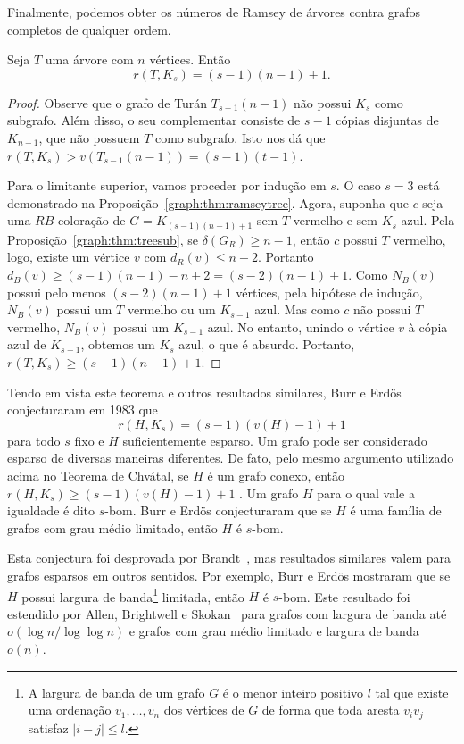 Finalmente, podemos obter os números de Ramsey de árvores contra grafos completos de qualquer ordem.

\begin{theorem}
\label{graph:thm:chvatal}
Seja $T$ uma árvore com $n$ vértices. Então
\[r(T,K_s) = (s-1)(n-1) + 1.\]
\end{theorem}
\begin{proof}
Observe que o grafo de Turán $T_{s-1}(n-1)$ não possui $K_s$ como subgrafo. Além disso, o seu complementar consiste de $s-1$ cópias disjuntas de $K_{n-1}$, que não possuem $T$ como subgrafo. Isto nos dá que $r(T,K_s) > v(T_{s-1}(n-1)) = (s-1)(t-1)$.

Para o limitante superior, vamos proceder por indução em $s$. O caso $s = 3$ está demonstrado na Proposição~\ref{graph:thm:ramseytree}. Agora, suponha que $c$ seja uma $RB$-coloração de $G = K_{(s-1)(n-1) + 1}$ sem $T$ vermelho e sem $K_s$ azul.
Pela Proposição~\ref{graph:thm:treesub}, se $\delta(G_R) \geq n-1$, então $c$ possui $T$ vermelho, logo, existe um vértice $v$ com $d_R(v) \leq n - 2$. Portanto $d_B(v) \geq (s-1)(n-1) - n + 2 = (s-2)(n-1) + 1$.
Como $N_B(v)$ possui pelo menos $(s-2)(n-1) + 1$ vértices, pela hipótese de indução, $N_B(v)$ possui um $T$ vermelho ou um $K_{s-1}$ azul. Mas como $c$ não possui $T$ vermelho, $N_B(v)$ possui um $K_{s-1}$ azul. No entanto, unindo o vértice $v$ à cópia azul de $K_{s-1}$, obtemos um $K_s$ azul, o que é absurdo. Portanto, $r(T,K_s) \geq (s-1)(n-1) + 1$.
\end{proof}

Tendo em vista este teorema e outros resultados similares, Burr e Erdös~\cite{burr1983generalizations} conjecturaram em 1983 que
\[ r(H,K_s) = (s-1)(v(H) - 1) + 1\]
para todo $s$ fixo e $H$ suficientemente esparso. Um grafo pode ser considerado esparso de diversas maneiras diferentes. De fato, pelo mesmo argumento utilizado acima no Teorema de Chvátal, se $H$ é um grafo conexo, então $r(H,K_s) \geq (s-1)(v(H) - 1) + 1$ . Um grafo $H$ para o qual vale a igualdade é dito $s$-bom.
Burr e Erdös conjecturaram que se $H$ é uma família de grafos com grau médio limitado, então $H$ é $s$-bom.

Esta conjectura foi desprovada por Brandt~\cite{brandty1996expanding}, mas resultados similares valem para grafos esparsos em outros sentidos. Por exemplo, Burr e Erdös mostraram que se $H$ possui largura de banda\footnote{A largura de banda de um grafo $G$ é o menor inteiro positivo $l$ tal que existe uma ordenação $v_1, \dots, v_n$ dos vértices de $G$ de forma que toda aresta $v_i v_j$ satisfaz $|i - j| \leq l$.} limitada, então $H$ é $s$-bom. Este resultado foi estendido por Allen, Brightwell e Skokan~\cite{allen2013ramsey} para grafos com largura de banda até $o(\log n / \log \log n)$ e grafos com grau médio limitado e largura de banda $o(n)$.

